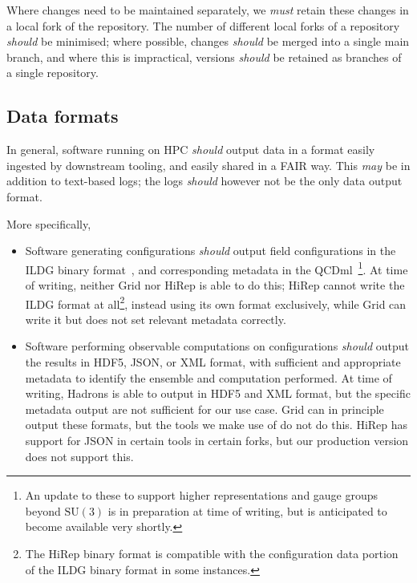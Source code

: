 \documentclass{article}
\newcommand\rfcword[1]{\emph{#1}\xspace}
\newcommand\must{\rfcword{must}}
\newcommand\should{\rfcword{should}}
\newcommand\may{\rfcword{may}}
\begin{document}
Where changes need to be maintained separately,
we \must retain these changes in a local fork of the repository.
The number of different local forks of a repository \should be minimised;
where possible,
changes \should be merged into a single main branch,
and where this is impractical,
versions \should be retained as branches of a single repository.

\subsection{Data formats}

In general,
software running on HPC \should output data in a format easily ingested by downstream tooling,
and easily shared in a FAIR way.
This \may be in addition to text-based logs;
the logs \should however not be the only data output format.

More specifically,
\begin{itemize}
  \item
        Software generating configurations
        \should output field configurations in the ILDG binary format~\cite{ildg-binary},
        and corresponding metadata in the QCDml~\cite{Maynard:2004wg}\footnote{
        An update to these to support
        higher representations and gauge groups beyond $\mathrm{SU}(3)$
        is in preparation at time of writing,
        but is anticipated to become available very shortly.
        }.
        At time of writing,
        neither Grid nor HiRep is able to do this;
        HiRep cannot write the ILDG format at all\footnote{
          The HiRep binary format is compatible with
          the configuration data portion of the ILDG binary format
          in some instances.
        },
        instead using its own format exclusively,
        while Grid can write it but does not set relevant metadata correctly.
  \item
        Software performing observable computations on configurations
        \should output the results in HDF5, JSON, or XML format,
        with sufficient and appropriate metadata to identify the ensemble and computation performed.
        At time of writing,
        Hadrons is able to output in HDF5 and XML format,
        but the specific metadata output are not sufficient for our use case.
        Grid can in principle output these formats,
        but the tools we make use of do not do this.
        HiRep has support for JSON in certain tools in certain forks,
        but our production version does not support this.
\end{itemize}
\end{document}

